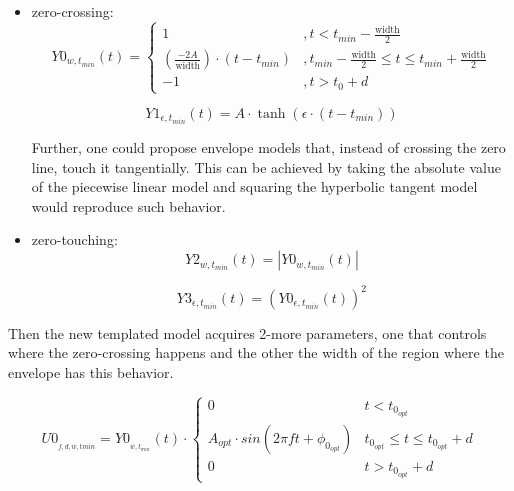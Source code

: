 \vspace{1cm}

\begin{itemize}[leftmargin=*]
\item zero-crossing:
\begin{equation}\label{line}
Y0_{w, t_{min}}(t) =
\begin{cases} 
      1 &, t<t_{min}-\mathrm{\frac{width}{2}} \\
      \left( \frac{-2A}{\mathrm{width}} \right) \cdot (t- t_{min}) &, t_{min}-\mathrm{\frac{width}{2}} \leq t \leq t_{min}+\mathrm{\frac{width}{2}} \\
     -1 &, t>t_{0}+d
   \end{cases}
\end{equation}

\begin{equation}\label{tanh}
Y1_{\epsilon, t_{min}}(t) = A \cdot \tanh (\epsilon \cdot(t-t_{min}))
\end{equation}

Further, one could propose envelope models that, instead of crossing the zero line, touch it tangentially. This can be achieved by taking the absolute value of the piecewise linear model and squaring the hyperbolic tangent model would reproduce such behavior.


\item zero-touching:
\begin{equation}\label{line-abs}
Y2_{w, t_{min}}(t) = \left| Y0_{w, t_{min}}(t) \right|
\end{equation}

\begin{equation}\label{tanh2}
Y3_{\epsilon, t_{min}}(t) = \left( Y0_{\epsilon, t_{min}}(t) \right)^2
\end{equation}

\end{itemize}

Then the new templated model acquires 2-more parameters, one that controls where the zero-crossing happens and the other the width of the region where the envelope has this behavior.

\begin{equation}\label{4dim-model}
U0_{_{f,d, w, tmin}} = Y0_{_{w,t_{min}}}(t) \cdot
\begin{cases} 
      0 & t<t_{0_{opt}} \\
      A_{opt} \cdot sin(2\pi f t + \phi_{0_{opt}}) & t_{0_{opt}} \leq t\leq t_{0_{opt}}+d \\
      0 & t>t_{0_{opt}}+d
   \end{cases}
\end{equation}


